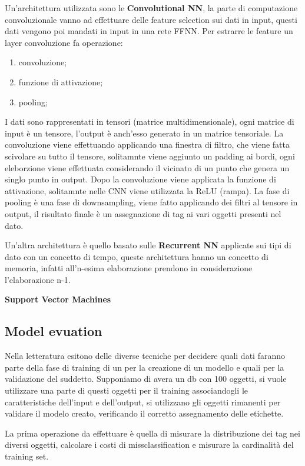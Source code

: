 \documentclass[12pt]{article}
\begin{document}
Un'architettura utilizzata sono le \textbf{Convolutional NN}, la parte di computazione convoluzionale vanno ad effettuare delle feature selection sui dati in input, questi dati vengono poi mandati in input in una rete FFNN. Per estrarre le feature un layer convoluzione fa operazione:
\begin{enumerate}
    \item convoluzione;
    \item funzione di attivazione;
    \item pooling;
\end{enumerate}
I dati sono rappresentati in tensori (matrice multidimensionale), ogni matrice di input \`e un tensore, l'output \`e anch'esso generato in un matrice tensoriale. La convoluzione viene effettuando applicando una finestra di filtro, che viene fatta scivolare su tutto il tensore, solitamnte viene aggiunto un padding ai bordi, ogni eleborzione viene effettuata considerando il vicinato di un punto che genera un singlo punto in output. Dopo la convoluzione viene applicata la funzione di attivazione, solitamnte nelle CNN viene utilizzata la ReLU (rampa). La fase di pooling \`e una fase di downsampling, viene fatto applicando dei filtri al tensore in output, il risultato finale \`e un assegnazione di tag ai vari oggetti presenti nel dato.

Un'altra architettura \`e quello basato sulle \textbf{Recurrent NN} applicate sui tipi di dato con un concetto di tempo, queste architettura hanno un concetto di memoria, infatti all'n-esima elaborazione prendono in considerazione l'elaborazione n-1.

\textbf{Support Vector Machines}



\subsection{Model evuation}
Nella letteratura esitono delle diverse tecniche per decidere quali dati faranno parte della fase di training di un per la creazione di un modello e quali per la validazione del suddetto. Supponiamo di avera un db con 100 oggetti, si vuole utilizzare una parte di questi oggetti per il training associandogli le caratteristiche dell'input e dell'output, si utilizzano gli oggetti rimanenti per validare il modelo creato, verificando il corretto assegnamento delle etichette. 

La prima operazione da effettuare \`e quella di misurare la distribuzione dei tag nei diversi oggetti, calcolare i costi di missclassification e misurare la cardinalit\`a del training set.
\end{document}
